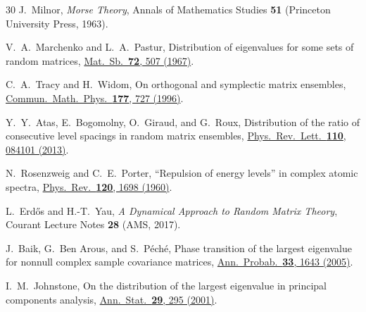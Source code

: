 \documentclass[aps,pre,twocolumn,superscriptaddress,showpacs]{revtex4-2}
\begin{document}
\begin{thebibliography}{30}
J.~Milnor,
\textit{Morse Theory},
Annals of Mathematics Studies \textbf{51} (Princeton University Press, 1963).

V.~A.\ Marchenko and L.~A.\ Pastur,
Distribution of eigenvalues for some sets of random matrices,
\href{https://doi.org/10.1070/SM1967v001n04ABEH001994}{Mat.\ Sb.\ \textbf{72}, 507 (1967)}.

C.~A.\ Tracy and H.~Widom,
On orthogonal and symplectic matrix ensembles,
\href{https://doi.org/10.1007/BF02100489}{Commun.\ Math.\ Phys.\ \textbf{177}, 727 (1996)}.

Y.~Y.\ Atas, E.~Bogomolny, O.~Giraud, and G.~Roux,
Distribution of the ratio of consecutive level spacings in random matrix ensembles,
\href{https://doi.org/10.1103/PhysRevLett.110.084101}{Phys.\ Rev.\ Lett.\ \textbf{110}, 084101 (2013)}.

N.~Rosenzweig and C.~E.\ Porter,
``Repulsion of energy levels'' in complex atomic spectra,
\href{https://doi.org/10.1103/PhysRev.120.1698}{Phys.\ Rev.\ \textbf{120}, 1698 (1960)}.

L.~Erdős and H.-T.\ Yau,
\textit{A Dynamical Approach to Random Matrix Theory},
Courant Lecture Notes \textbf{28} (AMS, 2017).

J.~Baik, G.~Ben Arous, and S.~P\'ech\'e,
Phase transition of the largest eigenvalue for nonnull complex sample covariance matrices,
\href{https://doi.org/10.1214/009117905000000233}{Ann.\ Probab.\ \textbf{33}, 1643 (2005)}.

I.~M.\ Johnstone,
On the distribution of the largest eigenvalue in principal components analysis,
\href{https://doi.org/10.1214/aos/1009210544}{Ann.\ Stat.\ \textbf{29}, 295 (2001)}.

\end{thebibliography}
\end{document}
